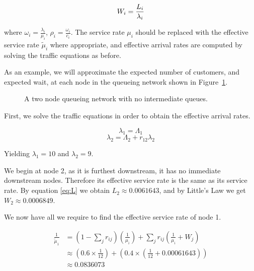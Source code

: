 \documentclass{article}
\begin{document}
\begin{equation}
    W_i = {L_i \over \lambda_i}
\end{equation}

where $\omega_i = \frac{\lambda_i}{\mu_i}$, $\rho_i = \frac{\omega_i}{c_i}$.
The service rate $\mu_i$ should be replaced with the effective service rate $\tilde{\mu}_i$ where appropriate, and effective arrival rates are computed by solving the traffic equations as before.

As an example, we will approximate the expected number of customers, and expected wait, at each node in the queueing network shown in Figure~\ref{fig:approxnet}.

\begin{figure}[H]
    
    \caption{A two node queueing network with no intermediate queues.}
    \label{fig:approxnet}
\end{figure}

First, we solve the traffic equations in order to obtain the effective arrival rates.

\begin{equation*}
    \lambda_1 = \Lambda_1
\end{equation*}
\begin{equation*}
    \lambda_2 = \Lambda_2 + r_{12} \lambda_2
\end{equation*}

Yielding $\lambda_1 = 10$ and $\lambda_2 = 9$.

We begin at node 2, as it is furthest downstream, it has no immediate downstream nodes.
Therefore its effective service rate is the same as its service rate.
By equation \eqref{eq:L} we obtain $L_2 \approx 0.0061643$, and by Little's Law we get $W_2 \approx 0.0006849$.

We now have all we require to find the effective service rate of node 1.

\begin{equation*}
    \begin{split}
    \frac{1}{\tilde{\mu}_1} & = \left( 1 - \sum_j r_{ij} \right) \left( \frac{1}{\mu_i} \right) + \sum_j r_{ij} \left( \frac{1}{\mu_i} + W_j \right) \\
    & \approx \left( 0.6 \times \frac{1}{12} \right) + \left( 0.4 \times \left( \frac{1}{12} + 0.00061643 \right) \right) \\
    & \approx 0.0836073
    \end{split}
\end{equation*}
\end{document}
